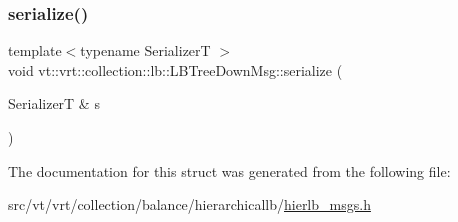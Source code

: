\mbox{\label{structvt_1_1vrt_1_1collection_1_1lb_1_1_l_b_tree_down_msg_a13f9e708fad12e306592dcbc1bf66171}} 
\subsubsection{\texorpdfstring{serialize()}{serialize()}}
{\footnotesize\ttfamily template$<$typename SerializerT $>$ \\
void vt\+::vrt\+::collection\+::lb\+::\+L\+B\+Tree\+Down\+Msg\+::serialize (\begin{DoxyParamCaption}\item[{SerializerT \&}]{s }\end{DoxyParamCaption})\hspace{0.3cm}{\ttfamily [inline]}}



The documentation for this struct was generated from the following file\+:\begin{DoxyCompactItemize}
\item 
src/vt/vrt/collection/balance/hierarchicallb/\hyperlink{hierlb__msgs_8h}{hierlb\+\_\+msgs.\+h}\end{DoxyCompactItemize}
